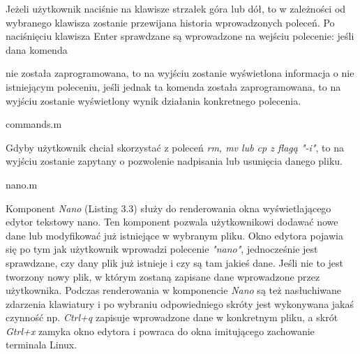 \documentclass[10pt,a4paper]{report}
\begin{document}
\begin{adjustwidth}{2cm}{2cm}
\begin{minipage}{1\linewidth}
Jeżeli użytkownik naciśnie na klawisze strzałek góra lub dół, to w zależności od wybranego klawisza zostanie przewijana historia wprowadzonych poleceń. Po naciśnięciu klawisza Enter sprawdzane są wprowadzone na wejściu polecenie: jeśli dana komenda
\end{minipage}
\begin{minipage}{1\linewidth}
 nie została zaprogramowana, to na wyjściu zostanie wyświetlona informacja o nie istniejącym poleceniu, jeśli jednak ta komenda została zaprogramowana, to na wyjściu zostanie wyświetlony wynik działania konkretnego polecenia.
\end{minipage}
\begin{center}
\begin{lstinputlisting}[ escapeinside=``,caption={\textit{Renderowanie w komponencie Commands}}]
{commands.m}
\end{lstinputlisting}
\end{center}
\begin{minipage}{1\linewidth}
\vspace{0.2cm}
Gdyby użytkownik chciał skorzystać z poleceń \textit{ rm, mv lub cp z flagą "-i"}, to na wyjściu zostanie zapytany o pozwolenie nadpisania lub usunięcia danego pliku. 
\end{minipage}
\begin{center}
\begin{lstinputlisting}[ escapeinside=``,caption={\textit{Komponent Nano użyty w projekcie}}]
{nano.m}
\end{lstinputlisting}
\end{center}
\begin{minipage}{1\linewidth}
\vspace{0.2cm}
Komponent \textit{Nano} (Listing 3.3) służy do renderowania okna wyświetlającego edytor tekstowy nano. Ten komponent pozwala użytkownikowi dodawać nowe dane lub modyfikować już istniejące w wybranym pliku. Okno edytora pojawia się po tym jak użytkownik wprowadzi polecenie \textit{"nano"}, jednocześnie jest sprawdzane, czy dany plik już istnieje i czy są tam jakieś dane. Jeśli nie to jest tworzony nowy plik, w którym zostaną zapisane dane wprowadzone przez użytkownika. Podczas renderowania w komponencie \textit{Nano} są też nasłuchiwane zdarzenia klawiatury i po wybraniu odpowiedniego skróty jest wykonywana jakaś czynność np. \textit{Ctrl+q} zapisuje wprowadzone dane w konkretnym pliku, a skrót \textit{Gtrl+x} zamyka okno edytora i powraca do okna imitującego zachowanie terminala Linux.
\end{minipage}

\end{adjustwidth}
\end{document}
